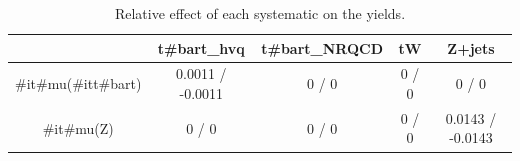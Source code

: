 \documentclass[10pt]{article}
\begin{document}
\begin{table}[htbp]
\begin{center}
\begin{tabular}{|c|c|c|c|c|}
\hline 
      & t#bar{t}_{hvq}      & t#bar{t}_{NRQCD}      & tW      & Z+jets \\ 
\hline 
  #it{#mu}(#it{t#bar{t}}) & 0.0011 / -0.0011 & 0 / 0 & 0 / 0 & 0 / 0 \\ 
  #it{#mu}(Z) & 0 / 0 & 0 / 0 & 0 / 0 & 0.0143 / -0.0143 \\ 
\hline 
\end{tabular} 
\caption{Relative effect of each systematic on the yields.} 
\end{center} 
\end{table} 
\end{document}
